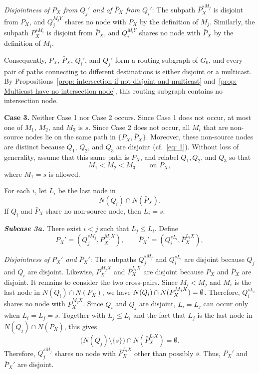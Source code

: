 \documentclass[11pt]{article}
\begin{document}
\par\vspace{0.4em}
\noindent\emph{Disjointness of \(P_X\) from \(Q_j'\) and of \(\bar P_X\) from \(Q_i'\)}:
The subpath \(\bar P_X^{sM_j}\) is disjoint from \(P_X\), and \(Q_j^{M_jY}\) shares no node with \(P_X\) by the definition of \(M_j\). Similarly, the subpath \(P_X^{sM_i}\) is disjoint from \(\bar P_X\), and \(Q_i^{M_iY}\) shares no node with \(\bar P_X\) by the definition of \(M_i\).

\smallskip
\noindent Consequently, \(P_X\), \(\bar P_X\), \(Q_i'\), and \(Q_j'\) form a routing subgraph of \(G_0\), and every pair of paths connecting to different destinations is either disjoint or a multicast. By Propositions~\ref{prop: intersection if not disjoint and multicast} and~\ref{prop: Multicast have no intersection node}, this routing subgraph contains no intersection node.

\smallskip
\noindent\textbf{Case 3.}
Neither Case 1 nor Case 2 occurs. Since Case 1 does not occur, at most one of \(M_1\), \(M_2\), and \(M_3\) is \(s\). Since Case 2 does not occur, all \(M_i\) that are non-source nodes lie on the same path in \(\{P_X,\bar P_X\}\). Moreover, these non-source nodes are distinct because \(Q_1\), \(Q_2\), and \(Q_3\) are disjoint (cf.~\eqref{eq: 1}). Without loss of generality, assume that this same path is \(P_X\), and relabel \(Q_1,Q_2\), and \(Q_3\) so that
\[
M_1<M_2<M_3
\qquad\text{on }P_X,
\]
where \(M_1=s\) is allowed.

For each \(i\), let \(L_i\) be the last node in
\begin{equation}\label{eq: 2}
    N(Q_i)\cap N(\bar P_X).
\end{equation}
If \(Q_i\) and \(\bar P_X\) share no non-source node, then \(L_i=s\).

\par\vspace{0.4em}
\noindent\textbf{\emph{Subcase 3a.}}
There exist \(i<j\) such that \(L_j\le L_i\). Define
\[
P_X'=(Q_j^{sM_j},P_X^{M_jX}),
\qquad
\bar P_X'=(Q_i^{sL_i},\bar P_X^{L_iX}),
\]
\par\vspace{0.4em}
\noindent\emph{Disjointness of \(P_X'\) and \(\bar P_X'\)}:
The subpaths \(Q_j^{sM_j}\) and \(Q_i^{sL_i}\) are disjoint because \(Q_j\) and \(Q_i\) are disjoint. Likewise, \(P_X^{M_jX}\) and \(\bar P_X^{L_iX}\) are disjoint because \(P_X\) and \(\bar P_X\) are disjoint. It remains to consider the two cross-pairs. Since \(M_i<M_j\) and \(M_i\) is the last node in \(N(Q_i)\cap N(P_X)\), we have \(N(Q_i)\cap N(P_X^{M_jX})=\nobreak\emptyset\). Therefore, \(Q_i^{sL_i}\) shares no node with \(P_X^{M_jX}\). Since \(Q_i\) and \(Q_j\) are disjoint, \(L_i=L_j\) can occur only when \(L_i=L_j=s\). Together with \(L_j\le L_i\) and the fact that \(L_j\) is the last node in \(N(Q_j)\cap N(\bar{P}_X)\), this gives
\[
\bigl(N(Q_j)\setminus\{s\}\bigr)\cap N(\bar P_X^{L_iX})=\emptyset.
\]
Therefore, \(Q_j^{sM_j}\) shares no node with \(\bar P_X^{L_iX}\) other than possibly \(s\). Thus, \(P_X'\) and \(\bar P_X'\) are disjoint.
\end{document}
